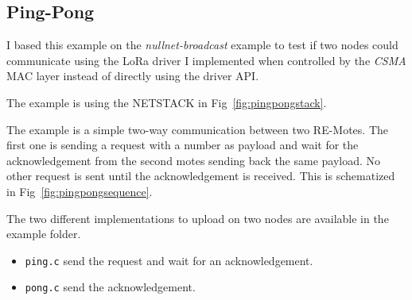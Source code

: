 \subsection{Ping-Pong\label{section:pingpong}}

I based this example on the \emph{nullnet-broadcast} example to test if two
nodes could communicate using the LoRa driver I implemented when controlled by
the \emph{CSMA} MAC layer instead of directly using the driver API\@.

The example is using the NETSTACK in Fig~\ref{fig:pingpongstack}.



The example is a simple two-way communication between two RE-Motes. 
The first one is sending a request with a number as
payload and wait for the acknowledgement from the second motes sending back
the same payload. 
No other request is sent until the acknowledgement is received.
This is schematized in Fig~\ref{fig:pingpongsequence}.

The two different implementations to upload on two nodes are available in the
example folder.

\begin{itemize}
  \item \lstinline{ping.c} send the request and wait for an acknowledgement.
  \item \lstinline{pong.c} send the acknowledgement.
\end{itemize}


